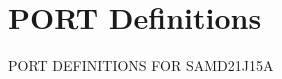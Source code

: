 \hypertarget{group___s_a_m_d21_j15_a__port}{}\section{P\+O\+RT Definitions}
\label{group___s_a_m_d21_j15_a__port}
P\+O\+RT D\+E\+F\+I\+N\+I\+T\+I\+O\+NS F\+OR S\+A\+M\+D21\+J15A 